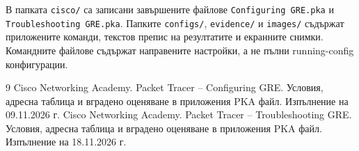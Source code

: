 \documentclass[12pt]{article}
\begin{document}
В папката \texttt{cisco/} са записани завършените файлове \texttt{Configuring GRE.pka} и \texttt{Troubleshooting GRE.pka}. Папките \texttt{configs/}, \texttt{evidence/} и \texttt{images/} съдържат приложените команди, текстов препис на резултатите и екранните снимки. Командните файлове съдържат направените настройки, а не пълни running-config конфигурации.

\begin{thebibliography}{9}
 Cisco Networking Academy. Packet Tracer -- Configuring GRE. Условия, адресна таблица и вградено оценяване в приложения PKA файл. Изпълнение на 09.11.2026 г.
 Cisco Networking Academy. Packet Tracer -- Troubleshooting GRE. Условия, адресна таблица и вградено оценяване в приложения PKA файл. Изпълнение на 18.11.2026 г.
\end{thebibliography}
\end{document}
